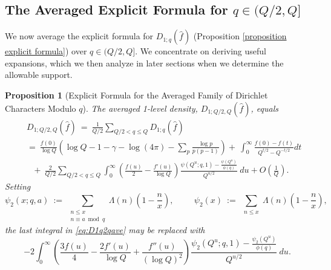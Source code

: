 \documentclass[12pt,reqno]{amsart}
\numberwithin{equation}{section}
\theoremstyle{plain}
\newtheorem{proposition}[thm]{Proposition}
\begin{document}
\subsection{The Averaged Explicit Formula for $q \in (Q/2, Q]$}

We now average the explicit formula for $D_{1;q}(\widehat{f})$ (Proposition \ref{proposition explicit formula}) over $q \in (Q/2,Q]$. We concentrate on deriving useful expansions, which we then analyze in later sections when we determine the allowable support.

\begin{proposition}[Explicit Formula for the Averaged Family of Dirichlet Characters Modulo $q$]\label{proposition averaged explicit formula} The averaged 1-level density, $D_{1;Q/2,Q}(\widehat{f})$, equals \begin{eqnarray}\label{eq:D1q2qave} & & D_{1;Q/2,Q}(\widehat{f}) \ = \
\frac1{Q/2} \sum_{Q/2 < q \le Q} D_{1;q}(\widehat{f}) \nonumber\\ && = \ \frac{f(0)}{\log Q} \left( \log Q -1-\gamma-\log(4\pi) -\sum_p \frac{\log p}{p(p-1)}\right)  + \ \int_0^{\infty}\frac{f(0)-f(t)}{Q^{t/2}-Q^{-t/2}} dt \nonumber\\ & & \ \ \ + \ \frac{2}{Q/2} \sum_{Q/2 < q \le Q} \int_0^{\infty} \left(\frac {f(u)}2 -\frac {f'(u)}{\log Q}\right)\frac{\psi(Q^u;q,1)-\frac{\psi(Q^u)}{\phi(q)}}{Q^{u/2}}\ du + O\left(\frac1{Q}\right). \end{eqnarray}
Setting \begin{equation}\label{eq:psi2def} \psi_2(x;q,a) \ :=\ \sum_{\substack{n\leq x\\n\equiv a \bmod q}} \Lambda(n)\left(1-\frac nx\right), \hspace{1cm} \psi_2(x) \ :=\ \sum_{\substack{n\leq x}} \Lambda(n)\left(1-\frac nx\right), \end{equation} the last integral in \eqref{eq:D1q2qave} may be replaced with
\begin{equation} -2 \int_0^{\infty} \left(\frac {3f(u)}4 -\frac {2f'(u)}{\log Q} +\frac {f''(u)}{(\log Q)^2}\right)\frac{\psi_2(Q^u;q,1)-\frac{\psi_2(Q^u)}{\phi(q)}}{Q^{u/2}}\ du.
\end{equation}
\end{proposition}
\end{document}
